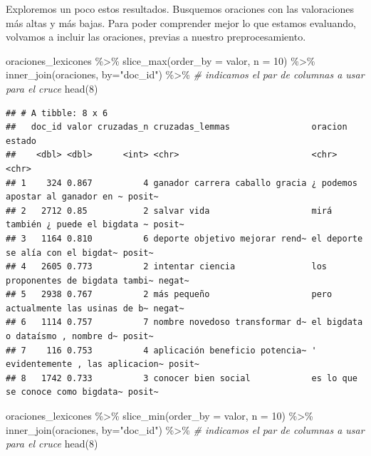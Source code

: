 \documentclass[
]{book}
\newenvironment{Shaded}{\begin{snugshade}}{\end{snugshade}}
\newcommand{\AttributeTok}[1]{\textcolor[rgb]{0.77,0.63,0.00}{#1}}
\newcommand{\CommentTok}[1]{\textcolor[rgb]{0.56,0.35,0.01}{\textit{#1}}}
\newcommand{\DecValTok}[1]{\textcolor[rgb]{0.00,0.00,0.81}{#1}}
\newcommand{\FunctionTok}[1]{\textcolor[rgb]{0.00,0.00,0.00}{#1}}
\newcommand{\NormalTok}[1]{#1}
\newcommand{\SpecialCharTok}[1]{\textcolor[rgb]{0.00,0.00,0.00}{#1}}
\newcommand{\StringTok}[1]{\textcolor[rgb]{0.31,0.60,0.02}{#1}}
\begin{document}
Exploremos un poco estos resultados. Busquemos oraciones con las valoraciones más altas y más bajas.
Para poder comprender mejor lo que estamos evaluando, volvamos a incluir las oraciones, previas a nuestro preprocesamiento.

\begin{Shaded}
\begin{Highlighting}[]
\NormalTok{oraciones\_lexicones }\SpecialCharTok{\%\textgreater{}\%}
  \FunctionTok{slice\_max}\NormalTok{(}\AttributeTok{order\_by =}\NormalTok{ valor, }\AttributeTok{n =} \DecValTok{10}\NormalTok{) }\SpecialCharTok{\%\textgreater{}\%}
  \FunctionTok{inner\_join}\NormalTok{(oraciones, }\AttributeTok{by=}\StringTok{"doc\_id"}\NormalTok{) }\SpecialCharTok{\%\textgreater{}\%} \CommentTok{\# indicamos el par de columnas a usar para el cruce}
  \FunctionTok{head}\NormalTok{(}\DecValTok{8}\NormalTok{)}
\end{Highlighting}
\end{Shaded}

\begin{verbatim}
## # A tibble: 8 x 6
##   doc_id valor cruzadas_n cruzadas_lemmas                oracion                           estado
##    <dbl> <dbl>      <int> <chr>                          <chr>                             <chr> 
## 1    324 0.867          4 ganador carrera caballo gracia ¿ podemos apostar al ganador en ~ posit~
## 2   2712 0.85           2 salvar vida                    mirá también ¿ puede el bigdata ~ posit~
## 3   1164 0.810          6 deporte objetivo mejorar rend~ el deporte se alía con el bigdat~ posit~
## 4   2605 0.773          2 intentar ciencia               los proponentes de bigdata tambi~ negat~
## 5   2938 0.767          2 más pequeño                    pero actualmente las usinas de b~ negat~
## 6   1114 0.757          7 nombre novedoso transformar d~ el bigdata o dataísmo , nombre d~ posit~
## 7    116 0.753          4 aplicación beneficio potencia~ ' evidentemente , las aplicacion~ posit~
## 8   1742 0.733          3 conocer bien social            es lo que se conoce como bigdata~ posit~
\end{verbatim}

\begin{Shaded}
\begin{Highlighting}[]
\NormalTok{oraciones\_lexicones }\SpecialCharTok{\%\textgreater{}\%}
  \FunctionTok{slice\_min}\NormalTok{(}\AttributeTok{order\_by =}\NormalTok{ valor, }\AttributeTok{n =} \DecValTok{10}\NormalTok{) }\SpecialCharTok{\%\textgreater{}\%}
  \FunctionTok{inner\_join}\NormalTok{(oraciones, }\AttributeTok{by=}\StringTok{"doc\_id"}\NormalTok{) }\SpecialCharTok{\%\textgreater{}\%} \CommentTok{\# indicamos el par de columnas a usar para el cruce}
  \FunctionTok{head}\NormalTok{(}\DecValTok{8}\NormalTok{)}
\end{Highlighting}
\end{Shaded}
\end{document}
